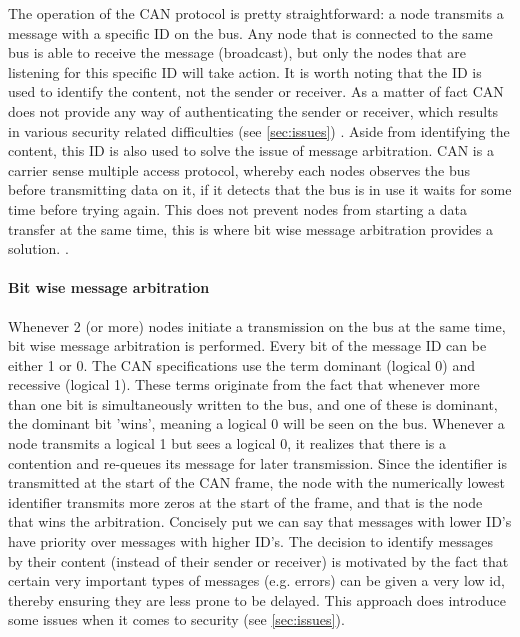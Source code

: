 \documentclass[master=cws,masteroption=vs,english]{kulemt}
\begin{document}
The operation of the CAN protocol is pretty straightforward: a node transmits a message with a specific ID on the bus. Any node that is connected to the same bus is able to receive the message (broadcast), but only the nodes that are listening for this specific ID will take action. It is worth noting that the ID is used to identify the content, not the sender or receiver. As a matter of fact CAN does not provide any way of authenticating the sender or receiver, which results in various security related difficulties (see \ref{sec:issues}) . Aside from identifying the content, this ID is also used to solve the issue of message arbitration. CAN is a carrier sense multiple access protocol, whereby each nodes observes the bus before transmitting data on it, if it detects that the bus is in use it waits for some time before trying again. This does not prevent nodes from starting a data transfer at the same time, this is where bit wise message arbitration provides a solution. \cite{CANarbitration}.

\paragraph{Bit wise message arbitration}

Whenever 2 (or more) nodes initiate a transmission on the bus at the same time, bit wise message arbitration is performed. Every bit of the message ID can be either 1 or 0. The CAN specifications use the term dominant (logical 0) and recessive (logical 1). These terms originate from the fact that whenever more than one bit is simultaneously written to the bus, and one of these is dominant, the dominant bit 'wins', meaning a logical 0 will be seen on the bus. Whenever a node transmits a logical 1 but sees a logical 0, it realizes that there is a contention and re-queues its message for later transmission. Since the identifier is transmitted at the start of the CAN frame, the node with the numerically lowest identifier transmits more zeros at the start of the frame, and that is the node that wins the arbitration. Concisely put we can say that messages with lower ID's have priority over messages with higher ID's. The decision to identify messages by their content (instead of their sender or receiver) is motivated by the fact that certain very important types of messages (e.g. errors) can be given a very low id, thereby ensuring they are less prone to be delayed. This approach does introduce some issues when it comes to security (see \ref{sec:issues}).
\end{document}
